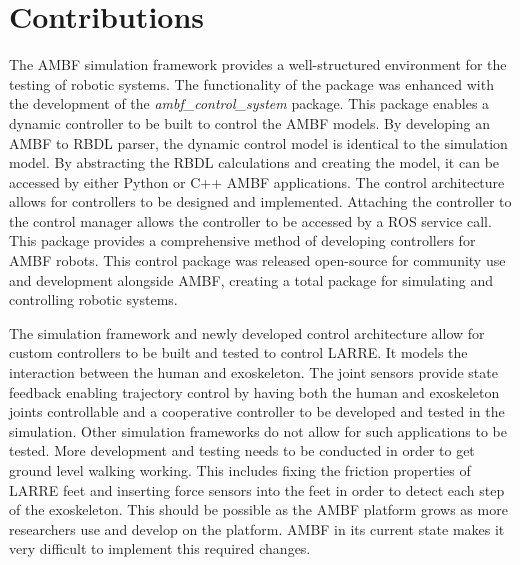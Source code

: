 \section{Contributions}

The AMBF simulation framework provides a well-structured environment for the testing of robotic systems. The functionality of the package was enhanced with the development of the \textit{ambf\_control\_system} package. This package enables a dynamic controller to be built to control the AMBF models. By developing an AMBF to RBDL parser, the dynamic control model is identical to the simulation model. By abstracting the RBDL calculations and creating the model, it can be accessed by either Python or C++ AMBF applications. The control architecture allows for controllers to be designed and implemented. Attaching the controller to the control manager allows the controller to be accessed by a ROS service call. This package provides a comprehensive method of developing controllers for AMBF robots. This control package was released open-source for community use and development alongside AMBF, creating a total package for simulating and controlling robotic systems.   

The simulation framework and newly developed control architecture allow for custom controllers to be built and tested to control LARRE. It models the interaction between the human and exoskeleton. The joint sensors provide state feedback enabling trajectory control by having both the human and exoskeleton joints controllable and a cooperative controller to be developed and tested in the simulation. Other simulation frameworks do not allow for such applications to be tested. More development and testing needs to be conducted in order to get ground level walking working. This includes fixing the friction properties of LARRE feet and inserting force sensors into the feet in order to detect each step of the exoskeleton. This should be possible as the AMBF platform grows as more researchers use and develop on the platform. AMBF in its current state makes it very difficult to implement this required changes.   








